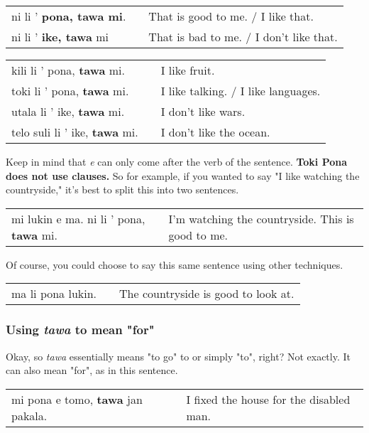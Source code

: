 \begin{supertabular}{p{5,5cm}|ll}
ni li ' \textbf{pona, tawa mi}. && That is good to me. / I like that. \\
ni li ' \textbf{ike, tawa} mi && That is bad to me. / I don't like that. \\
\end{supertabular} 

\begin{supertabular}{p{5,5cm}|ll}
kili li ' pona, \textbf{tawa} mi. && I like fruit. \\
toki li ' pona, \textbf{tawa} mi. && I like talking. / I like languages. \\
utala li ' ike, \textbf{tawa} mi. && I don't like wars. \\
telo suli li ' ike, \textbf{tawa} mi. && I don't like the ocean. \\
\end{supertabular} 

Keep in mind that \textit{e} can only come after the verb of the sentence. 
\textbf{Toki Pona does not use clauses.} 
So for example, if you wanted to say "I like watching the countryside," it's best to split this into two sentences.

\begin{supertabular}{p{5,5cm}|ll}
mi lukin e ma. ni li ' pona, \textbf{tawa} mi. && I'm watching the countryside. This is good to me.\\
\end{supertabular} 

Of course, you could choose to say this same sentence using other techniques. 

\begin{supertabular}{p{5,5cm}|ll}
ma li pona lukin. && The countryside is good to look at. \\
\end{supertabular} 

\subsubsection*{Using \textit{tawa} to mean "for"}
%
Okay, so \textit{tawa} essentially means "to go" to or simply "to", right? 
Not exactly. 
It can also mean "for", as in this sentence.
 
\begin{supertabular}{p{5,5cm}|ll}
mi pona e tomo, \textbf{tawa} jan pakala. && I fixed the house for the disabled man. \\
\end{supertabular} 

